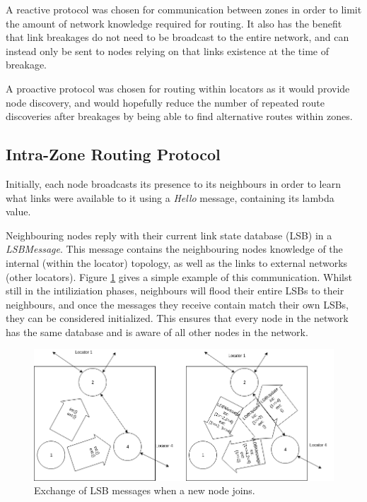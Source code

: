 \documentclass[12pt]{article}
\begin{document}
A reactive protocol was chosen for communication between zones in order to limit the amount of network knowledge required for routing. It also has the benefit that link breakages do not need to be broadcast to the entire network, and can instead only be sent to nodes relying on that links existence at the time of breakage.

A proactive protocol was chosen for routing within locators as it would provide node discovery, and would hopefully reduce the number of repeated route discoveries after breakages by being able to find alternative routes within zones.

\subsection{Intra-Zone Routing Protocol}

Initially, each node broadcasts its presence to its neighbours in order to learn what links were available to it using a \emph{Hello} message, containing its lambda value. 

Neighbouring nodes reply with their current link state database (LSB) in a \emph{LSBMessage}. This message contains the neighbouring nodes knowledge of the internal (within the locator) topology, as well as the links to external networks (other locators). Figure \ref{fig:lsbexchange} gives a simple example of this communication. Whilst still in the intiliziation phases, neighbours will flood their entire LSBs to their neighbours, and once the messages they receive contain match their own LSBs, they can be considered initialized. This ensures that every node in the network has the same database and is aware of all other nodes in the network.

\begin{figure}[!ht]
	\centering
	\includegraphics[width=\linewidth]{images/ldb}
	\caption{Exchange of LSB messages when a new node joins.}
	\label{fig:lsbexchange}
\end{figure}
\end{document}
